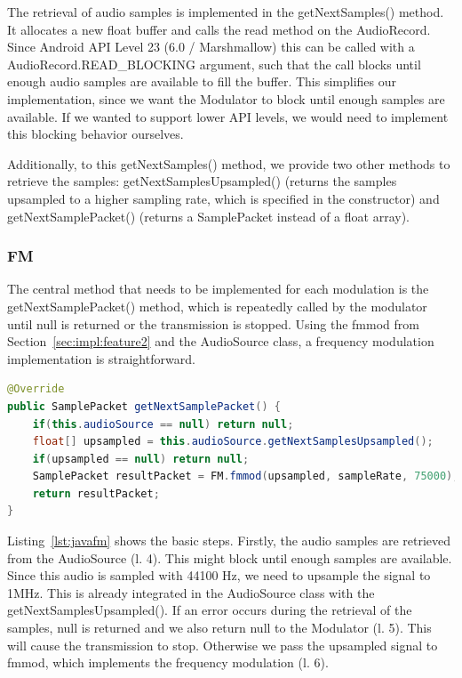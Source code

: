 The retrieval of audio samples is implemented in the getNextSamples() method. It allocates a new float buffer and calls the read method on the AudioRecord. Since Android API Level 23 (6.0 / Marshmallow) this can be called with a AudioRecord.READ\_BLOCKING argument, such that the call blocks until enough audio samples are available to fill the buffer. This simplifies our implementation, since we want the Modulator to block until enough samples are available. If we wanted to support lower API levels, we would need to implement this blocking behavior ourselves.

Additionally, to this getNextSamples() method, we provide two other methods to retrieve the samples: getNextSamplesUpsampled() (returns the samples upsampled to a higher sampling rate, which is specified in the constructor) and  getNextSamplePacket() (returns a SamplePacket instead of a float array).

\subsubsection{FM}

The central method that needs to be implemented for each modulation is the getNextSamplePacket() method, which is repeatedly called by the modulator until null is returned or the transmission is stopped. Using the fmmod from Section~\ref{sec:impl:feature2} and the AudioSource class, a frequency modulation implementation is straightforward. 

\begin{lstlisting}[label=lst:javafm, caption=Modulating microphone samples using frequency modulation, language=java,]
@Override
public SamplePacket getNextSamplePacket() {
	if(this.audioSource == null) return null;
	float[] upsampled = this.audioSource.getNextSamplesUpsampled();
	if(upsampled == null) return null;
	SamplePacket resultPacket = FM.fmmod(upsampled, sampleRate, 75000);
	return resultPacket;
}
\end{lstlisting}

Listing~\ref{lst:javafm} shows the basic steps. Firstly, the audio samples are retrieved from the AudioSource (l. 4). This might block until enough samples are available. Since this audio is sampled with 44100 Hz, we need to upsample the signal to 1MHz. This is already integrated in the AudioSource class with the getNextSamplesUpsampled(). If an error occurs during the retrieval of the samples, null is returned and we also return null to the Modulator (l. 5). This will cause the transmission to stop. Otherwise we pass the upsampled signal to fmmod, which implements the frequency modulation (l. 6). 

